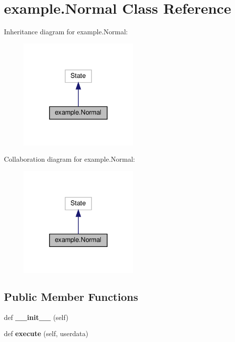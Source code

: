 \hypertarget{classexample_1_1Normal}{}\section{example.\+Normal Class Reference}
\label{classexample_1_1Normal}


Inheritance diagram for example.\+Normal\+:
\nopagebreak
\begin{figure}[H]
\begin{center}
\leavevmode
\includegraphics[width=168pt]{classexample_1_1Normal__inherit__graph}
\end{center}
\end{figure}


Collaboration diagram for example.\+Normal\+:
\nopagebreak
\begin{figure}[H]
\begin{center}
\leavevmode
\includegraphics[width=168pt]{classexample_1_1Normal__coll__graph}
\end{center}
\end{figure}
\subsection*{Public Member Functions}
\begin{DoxyCompactItemize}
\item 
\mbox{\label{classexample_1_1Normal_af5c2dec6f8c43562225e4f603ef8bdc2}} 
def {\bfseries \+\_\+\+\_\+init\+\_\+\+\_\+} (self)
\item 
\mbox{\label{classexample_1_1Normal_a6cb0fb9425d586ed74427f34c2a5bd2e}} 
def {\bfseries execute} (self, userdata)
\end{DoxyCompactItemize}


